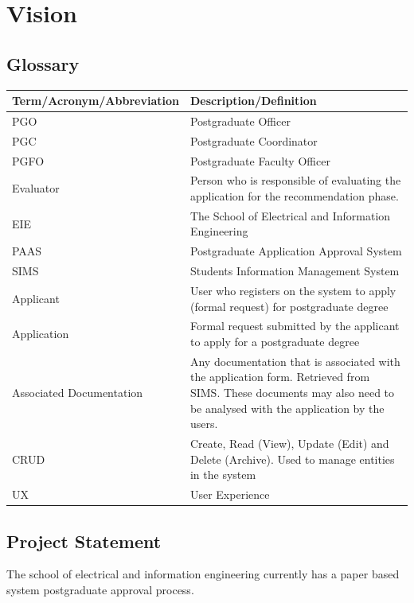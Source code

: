 \documentclass{article}
\begin{document}
\section{Vision}
\subsection{Glossary}
\begin{tabu} to \textwidth {| X[l] | X[l] |}
\hline
\textbf{Term/Acronym/Abbreviation} & \textbf{Description/Definition} \\
\hline
PGO & Postgraduate Officer \\
\hline
PGC & Postgraduate Coordinator \\
\hline
PGFO & Postgraduate Faculty Officer \\
\hline
Evaluator & Person who is responsible of evaluating the application for the recommendation phase. \\
\hline
EIE & The School of Electrical and Information Engineering \\
\hline
PAAS & Postgraduate Application Approval System \\
\hline
SIMS & Students Information Management System \\
\hline
Applicant & User who registers on the system to apply (formal request) for postgraduate degree \\
\hline
Application & Formal request submitted by the applicant to apply for a postgraduate degree \\
\hline
Associated Documentation & Any documentation that is associated with the application form. Retrieved from SIMS. These documents may also need to be analysed with the application by the users. \\
\hline
CRUD & Create, Read (View), Update (Edit) and Delete (Archive). Used to manage entities in the system \\
\hline
UX & User Experience \\
\hline
\end{tabu}
\subsection{Project Statement}
The school of electrical and information engineering currently has a paper based system postgraduate approval process. 
\end{document}
